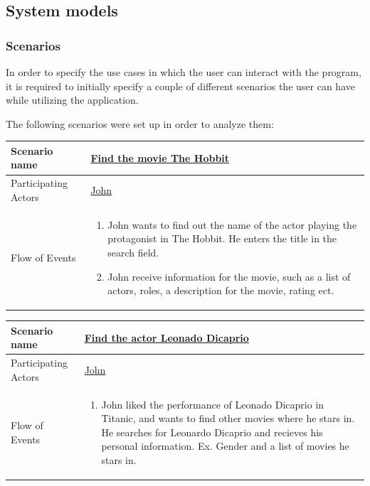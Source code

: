 \subsection{System models}

\subsubsection{Scenarios}
In order to specify the use cases in which the user can interact with the program, it is required to initially specify a couple of different scenarios the user can have while utilizing the application.

The following scenarios were set up in order to analyze them:

\begin{center}
	\begin{tabular}{ | l | p{10cm} |  }
		 \hline
		Scenario name & \underline{Find the movie The Hobbit}  \\ \hline
		Participating Actors & \underline{John} \\ \hline
		Flow of Events & \begin{enumerate}
						\item John wants to find out the name of the actor playing the protagonist in The Hobbit. He enters the title in the search field.
						\item John receive information for the movie, such as a list of actors, roles, a description for the movie, rating ect.
						\end{enumerate}
						\\ \hline
						
	\end{tabular}
\end{center}


\begin{center}
	\begin{tabular}{ | l | p{10cm} |  }
		 \hline
		Scenario name & \underline{Find the actor Leonado Dicaprio}  \\ \hline
		Participating Actors & \underline{John} \\ \hline
		Flow of Events & \begin{enumerate}
						\item John liked the performance of Leonado Dicaprio in Titanic, and wants to find other movies where he stars in. He searches for Leonardo Dicaprio and recieves his personal information. Ex. Gender and a list of movies he stars in.
						\end{enumerate}
						\\ \hline
						
	\end{tabular}
\end{center}


